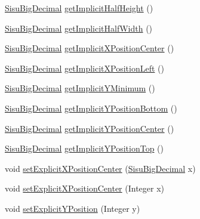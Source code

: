 \begin{DoxyCompactItemize}
\item 
\hyperlink{classcom_1_1aarrelaakso_1_1drawl_1_1_sisu_big_decimal}{Sisu\+Big\+Decimal} \hyperlink{classcom_1_1aarrelaakso_1_1drawl_1_1_shape_a33908342a13df06645b6ab7c1fd7a801}{get\+Implicit\+Half\+Height} ()
\item 
\hyperlink{classcom_1_1aarrelaakso_1_1drawl_1_1_sisu_big_decimal}{Sisu\+Big\+Decimal} \hyperlink{classcom_1_1aarrelaakso_1_1drawl_1_1_shape_a46d1d2823bc131d796a6a41383334d85}{get\+Implicit\+Half\+Width} ()
\item 
\hyperlink{classcom_1_1aarrelaakso_1_1drawl_1_1_sisu_big_decimal}{Sisu\+Big\+Decimal} \hyperlink{classcom_1_1aarrelaakso_1_1drawl_1_1_shape_a50c12c30790bd28ec0b71b58f59b1e96}{get\+Implicit\+X\+Position\+Center} ()
\item 
\hyperlink{classcom_1_1aarrelaakso_1_1drawl_1_1_sisu_big_decimal}{Sisu\+Big\+Decimal} \hyperlink{classcom_1_1aarrelaakso_1_1drawl_1_1_shape_ad9b2aee9937d5f034f7f4a2a1d979260}{get\+Implicit\+X\+Position\+Left} ()
\item 
\hyperlink{classcom_1_1aarrelaakso_1_1drawl_1_1_sisu_big_decimal}{Sisu\+Big\+Decimal} \hyperlink{classcom_1_1aarrelaakso_1_1drawl_1_1_shape_aa0877965f7f172378e87ba69f27c7ad6}{get\+Implicit\+Y\+Minimum} ()
\item 
\hyperlink{classcom_1_1aarrelaakso_1_1drawl_1_1_sisu_big_decimal}{Sisu\+Big\+Decimal} \hyperlink{classcom_1_1aarrelaakso_1_1drawl_1_1_shape_a5116673c093c60f66bba9fddf9533db6}{get\+Implicit\+Y\+Position\+Bottom} ()
\item 
\hyperlink{classcom_1_1aarrelaakso_1_1drawl_1_1_sisu_big_decimal}{Sisu\+Big\+Decimal} \hyperlink{classcom_1_1aarrelaakso_1_1drawl_1_1_shape_ad10def6c8dd7cbe03c281817406ab461}{get\+Implicit\+Y\+Position\+Center} ()
\item 
\hyperlink{classcom_1_1aarrelaakso_1_1drawl_1_1_sisu_big_decimal}{Sisu\+Big\+Decimal} \hyperlink{classcom_1_1aarrelaakso_1_1drawl_1_1_shape_a5ffc02627cca0723e3555b5d04ba2b75}{get\+Implicit\+Y\+Position\+Top} ()
\item 
void \hyperlink{classcom_1_1aarrelaakso_1_1drawl_1_1_shape_a8e4c74480fede49f44519554136c12b0}{set\+Explicit\+X\+Position\+Center} (\hyperlink{classcom_1_1aarrelaakso_1_1drawl_1_1_sisu_big_decimal}{Sisu\+Big\+Decimal} x)
\item 
void \hyperlink{classcom_1_1aarrelaakso_1_1drawl_1_1_shape_aa7855df6d98b3bfa556b7d857755181b}{set\+Explicit\+X\+Position\+Center} (Integer x)
\item 
void \hyperlink{classcom_1_1aarrelaakso_1_1drawl_1_1_shape_af8af5129e3e61324439a1035428016a2}{set\+Explicit\+Y\+Position} (Integer y)

\end{DoxyCompactItemize}
